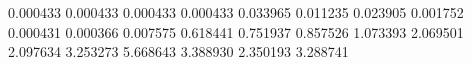0.000433
0.000433
0.000433
0.000433
0.033965
0.011235
0.023905
0.001752
0.000431
0.000366
0.007575
0.618441
0.751937
0.857526
1.073393
2.069501
2.097634
3.253273
5.668643
3.388930
2.350193
3.288741
